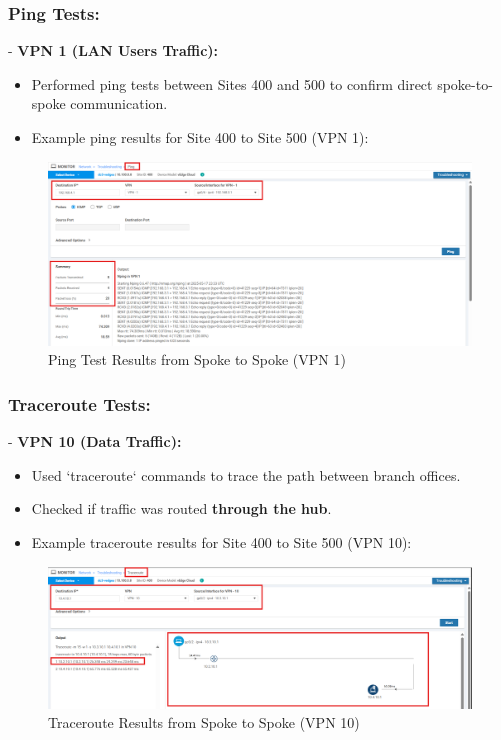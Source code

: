 \documentclass[12pt,english]{report}
\begin{document}
\subsubsection{Ping Tests:}
- \textbf{VPN 1 (LAN Users Traffic):}
  \begin{itemize}
      \item Performed ping tests between Sites 400 and 500 to confirm direct spoke-to-spoke communication.
      \item Example ping results for Site 400 to Site 500 (VPN 1):
  \end{itemize}
    \begin{figure}[H]
        \centering
        \includegraphics[width=1\textwidth]{chapter 4/spoke-spoke-ping-vpn1.png}
        \caption{Ping Test Results from Spoke to Spoke (VPN 1)}
        \label{fig:ping_spoke_to_spoke}
    \end{figure}

\subsubsection{Traceroute Tests:}
- \textbf{VPN 10 (Data Traffic):}
  \begin{itemize}
      \item Used `traceroute` commands to trace the path between branch offices.
      \item Checked if traffic was routed \textbf{through the hub}.
      \item Example traceroute results for Site 400 to Site 500 (VPN 10):
  \end{itemize}
    \begin{figure}[H]
        \centering
        \includegraphics[width=1\textwidth]{chapter 4/spoke-spoke-traceroute.png}
        \caption{Traceroute Results from Spoke to Spoke (VPN 10)}
        \label{fig:traceroute_spoke_to_spoke}
    \end{figure}
    
\end{document}
